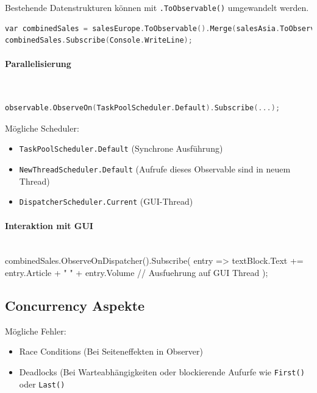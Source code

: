 Bestehende Datenstrukturen können mit \lstinline|.ToObservable()| umgewandelt werden.

\begin{lstlisting}[language=C]
var combinedSales = salesEurope.ToObservable().Merge(salesAsia.ToObservable());
combinedSales.Subscribe(Console.WriteLine);
\end{lstlisting}

\paragraph{Parallelisierung} \hfill \\

\begin{lstlisting}[language=C]
observable.ObserveOn(TaskPoolScheduler.Default).Subscribe(...);
\end{lstlisting}

Mögliche Scheduler:
\begin{itemize}
	\item \lstinline|TaskPoolScheduler.Default| (Synchrone Ausführung)
	\item \lstinline|NewThreadScheduler.Default| (Aufrufe dieses Observable sind in neuem Thread)
	\item \lstinline|DispatcherScheduler.Current| (GUI-Thread)
\end{itemize}

\paragraph{Interaktion mit GUI} \hfill \\

combinedSales.ObserveOnDispatcher().Subscribe(
	entry =>
		textBlock.Text += entry.Article + " " + entry.Volume // Ausfuehrung auf GUI Thread
);

\subsection{Concurrency Aspekte}

Mögliche Fehler:

\begin{itemize}
	\item Race Conditions (Bei Seiteneffekten in Observer)
	\item Deadlocks (Bei Warteabhängigkeiten oder blockierende Aufurfe wie \lstinline|First()| oder \lstinline|Last()|
\end{itemize}


